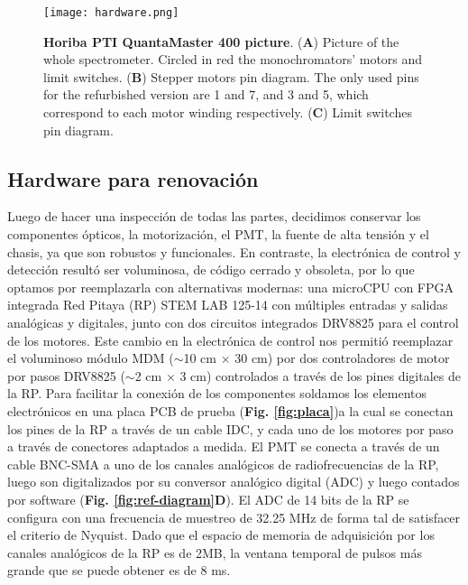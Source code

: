 \begin{figure}[h]
     \centering
     \texttt{[image: hardware.png]}
     \caption{\textbf{Horiba PTI QuantaMaster 400 picture}.  (\textbf{A}) Picture of the whole spectrometer. Circled in red the monochromators' motors and limit switches. (\textbf{B}) Stepper motors pin diagram. The only used pins for the refurbished version are 1 and 7, and 3 and 5, which correspond to each motor winding respectively. (\textbf{C}) Limit switches pin diagram.}
     \label{fig:hardware}
\end{figure}


\subsection{Hardware para renovación}

Luego de hacer una inspección de todas las partes, decidimos conservar los componentes ópticos, la motorización, el PMT, la fuente de alta tensión y el chasis, ya que son robustos y funcionales.  
En contraste, la electrónica de control y detección resultó ser voluminosa, de código cerrado y obsoleta, por lo que optamos por reemplazarla con alternativas modernas: una microCPU con FPGA integrada Red Pitaya (RP) STEM LAB 125-14 con múltiples entradas y salidas analógicas y digitales, junto con dos circuitos integrados DRV8825 para el control de los motores.  
Este cambio en la electrónica de control nos permitió reemplazar el voluminoso módulo MDM ($\sim$10 cm $\times$ 30 cm) por dos controladores de motor por pasos DRV8825 ($\sim$2 cm $\times$ 3 cm) controlados a través de los pines digitales de la RP.
Para facilitar la conexión de los componentes soldamos los elementos electrónicos en una placa PCB de prueba (\textbf{Fig. \ref{fig:placa}})a la cual se conectan los pines de la RP a través de un cable IDC, y cada uno de los motores por paso a través de conectores adaptados a medida.
El PMT se conecta a través de un cable BNC-SMA a uno de los canales analógicos de radiofrecuencias de la RP, luego son digitalizados por su conversor analógico digital (ADC) y luego contados por software (\textbf{Fig. \ref{fig:ref-diagram}D}).
El ADC de 14 bits de la RP se configura con una frecuencia de muestreo de 32.25 MHz de forma tal de satisfacer el criterio de Nyquist.
Dado que el espacio de memoria de adquisición por los canales analógicos de la RP es de 2MB, la ventana temporal de pulsos más grande que se puede obtener es de 8 ms.


